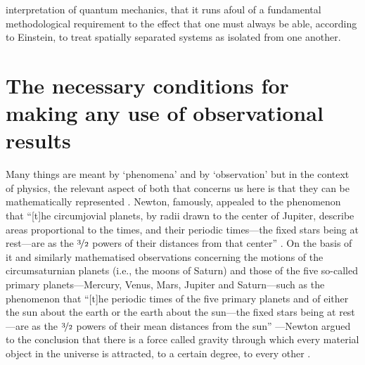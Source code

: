 \documentclass[12pt,english,twoside]{article}
\numberwithin{equation}{section}
\begin{document}
interpretation of quantum mechanics, that it runs afoul of a fundamental methodological requirement to the effect that one must always be able, according to Einstein, to treat spatially separated systems as isolated from one another.


\section{The necessary conditions for making any use of observational results}
\label{sec:necessary_conditions}

Many things are meant by `phenomena' and by `observation' but in the context of physics, the relevant aspect of both that concerns us here is that they can be mathematically represented \citep[]{bogenwoodward1988}. Newton, famously, appealed to the phenomenon that ``[t]he circumjovial planets, by radii drawn to the center of Jupiter, describe areas proportional to the times, and their periodic times---the fixed stars being at rest---are as the $\nicefrac{3}{2}$ powers of their distances from that center'' \citep[p. 797]{newton1999}. On the basis of it and similarly mathematised observations concerning the motions of the circumsaturnian planets (i.e., the moons of Saturn) and those of the five so-called primary planets---Mercury, Venus, Mars, Jupiter and Saturn---such as the phenomenon that ``[t]he periodic times of the five primary planets and of either the sun about the earth or the earth about the sun---the fixed stars being at rest---are as the $\nicefrac{3}{2}$ powers of their mean distances from the sun'' \citep[p. 801]{newton1999}---Newton argued to the conclusion that there is a force called gravity through which every material object in the universe is attracted, to a certain degree, to every other \citep[]{harper2011, smith2002}.
\end{document}
